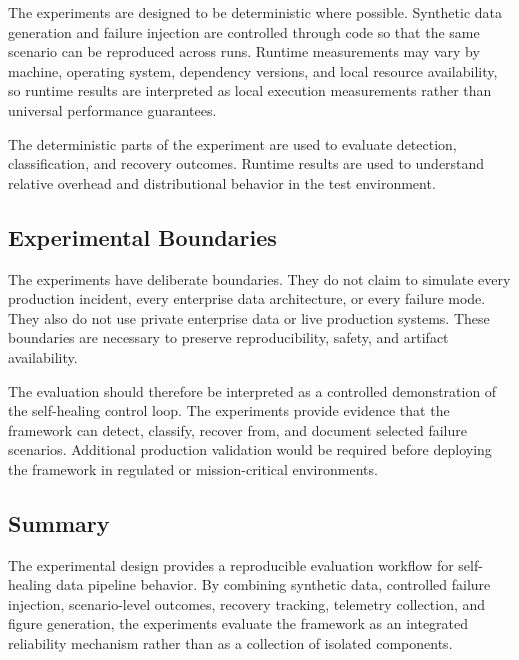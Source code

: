 The experiments are designed to be deterministic where possible. Synthetic data generation and failure injection are controlled through code so that the same scenario can be reproduced across runs. Runtime measurements may vary by machine, operating system, dependency versions, and local resource availability, so runtime results are interpreted as local execution measurements rather than universal performance guarantees.

The deterministic parts of the experiment are used to evaluate detection, classification, and recovery outcomes. Runtime results are used to understand relative overhead and distributional behavior in the test environment.

\subsection{Experimental Boundaries}

The experiments have deliberate boundaries. They do not claim to simulate every production incident, every enterprise data architecture, or every failure mode. They also do not use private enterprise data or live production systems. These boundaries are necessary to preserve reproducibility, safety, and artifact availability.

The evaluation should therefore be interpreted as a controlled demonstration of the self-healing control loop. The experiments provide evidence that the framework can detect, classify, recover from, and document selected failure scenarios. Additional production validation would be required before deploying the framework in regulated or mission-critical environments.

\subsection{Summary}

The experimental design provides a reproducible evaluation workflow for self-healing data pipeline behavior. By combining synthetic data, controlled failure injection, scenario-level outcomes, recovery tracking, telemetry collection, and figure generation, the experiments evaluate the framework as an integrated reliability mechanism rather than as a collection of isolated components.
